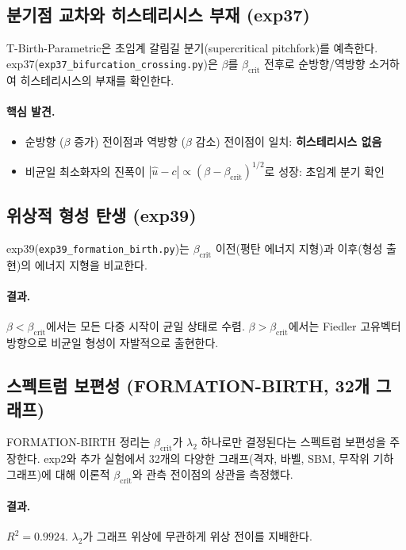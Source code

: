 \subsection{분기점 교차와 히스테리시스 부재 (exp37)}

T-Birth-Parametric은 초임계 갈림길 분기(supercritical pitchfork)를 예측한다. exp37(\texttt{exp37\_bifurcation\_crossing.py})은 $\beta$를 $\beta_{\mathrm{crit}}$ 전후로 순방향/역방향 소거하여 히스테리시스의 부재를 확인한다.

\paragraph{핵심 발견.}
\begin{itemize}
    \item 순방향 ($\beta$ 증가) 전이점과 역방향 ($\beta$ 감소) 전이점이 일치: \textbf{히스테리시스 없음}
    \item 비균일 최소화자의 진폭이 $|\hat{u} - c| \propto (\beta - \beta_{\mathrm{crit}})^{1/2}$로 성장: 초임계 분기 확인
\end{itemize}

\subsection{위상적 형성 탄생 (exp39)}

exp39(\texttt{exp39\_formation\_birth.py})는 $\beta_{\mathrm{crit}}$ 이전(평탄 에너지 지형)과 이후(형성 출현)의 에너지 지형을 비교한다.

\paragraph{결과.} $\beta < \beta_{\mathrm{crit}}$에서는 모든 다중 시작이 균일 상태로 수렴. $\beta > \beta_{\mathrm{crit}}$에서는 Fiedler 고유벡터 방향으로 비균일 형성이 자발적으로 출현한다.

\subsection{스펙트럼 보편성 (FORMATION-BIRTH, 32개 그래프)}

FORMATION-BIRTH 정리는 $\beta_{\mathrm{crit}}$가 $\lambda_2$ 하나로만 결정된다는 스펙트럼 보편성을 주장한다. exp2와 추가 실험에서 32개의 다양한 그래프(격자, 바벨, SBM, 무작위 기하 그래프)에 대해 이론적 $\beta_{\mathrm{crit}}$와 관측 전이점의 상관을 측정했다.

\paragraph{결과.} $R^2 = 0.9924$. $\lambda_2$가 그래프 위상에 무관하게 위상 전이를 지배한다.

